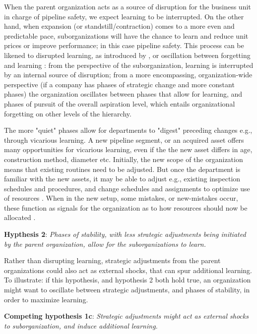 When the parent organization acts as a source of disruption for the business unit in charge of pipeline safety, we expect learning to be interrupted. On the other hand, when expansion (or standstill/contraction) comes to a more even and predictable pace, suborganizations will have the chance to learn and reduce unit prices or improve performance; in this case pipeline safety. This process can be likened to disrupted learning, as introduced by \citet{Rockart2019}, or oscillation between forgetting and learning \citep{Haunschild2015}: from the perspective of the suborganization, learning is interrupted by an internal source of disruption; from a more encompassing, organization-wide perspective (if a company has phases of strategic change and more constant phases) the organization oscillates between phases that allow for learning, and phases of pursuit of the overall aspiration level, which entails organizational forgetting on other levels of the hierarchy. 

The more "quiet" phases allow for departments to "digest" preceding changes e.g., through vicarious learning. A new pipeline segment, or an acquired asset offers many opportunities for vicarious learning, even if the the new asset differs in age, construction method, diameter etc. Initially, the new scope of the organization means that existing routines need to be adjusted. But once the department is familiar with the new assets, it may be able to adjust e.g., existing inspection schedules and procedures, and change schedules and assignments to optimize use of resources \citep{Huber1991}. When in the new setup, some mistakes, or new-mistakes occur, these function as signals for the organization as to how resources should now be allocated \citep{Baum2007, Desai2015}.

\textbf{Hypthesis 2}: \textit{Phases of stability, with less strategic adjustments being initiated by the parent organization, allow for the suborganizations to learn.}

Rather than disrupting learning, strategic adjustments from the parent organizations could also act as external shocks, that can spur additional learning. To illustrate: if this hypothesis, and hypothesis 2 both hold true, an organization might want to oscillate between strategic adjustments, and phases of stability, in order to maximize learning.

\textbf{Competing hypothesis 1c}: \textit{Strategic adjustments might act as external shocks to suborganization, and induce additional learning.}